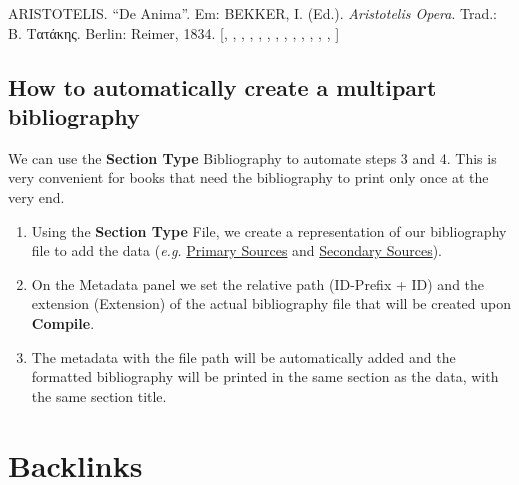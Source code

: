 \documentclass[
  10pt,
  oneside,
  cleardoublepage=empty,
  numbers=noenddot,
  titlepage,
  toclink=all,
  toc=bibliography,
  headinclude,
  footinclude]{scrbook}
\providecommand{\tightlist}{%
  \setlength{\itemsep}{0pt}\setlength{\parskip}{0pt}}\usepackage{longtable,booktabs,array}
\newlength{\cslhangindent}
\newenvironment{CSLReferences}[2] %
 {\begin{list}{}{%
  \setlength{\itemindent}{0pt}
  \setlength{\leftmargin}{0pt}
  \setlength{\parsep}{0pt}
  \ifodd #1
   \setlength{\leftmargin}{\cslhangindent}
   \setlength{\itemindent}{-1\cslhangindent}
  \fi
  \setlength{\itemsep}{#2\baselineskip}}}
 {\end{list}}
\theoremstyle{plain}
\theoremstyle{plain}
\theoremstyle{definition}
\theoremstyle{definition}
\theoremstyle{plain}
\theoremstyle{plain}
\theoremstyle{definition}
\theoremstyle{plain}
\theoremstyle{remark}
\begin{document}
\label{refs_primary-sources}
\begin{CSLReferences}{0}{1}
ARISTOTELIS. {``De Anima''}. Em: BEKKER, I. (Ed.). \emph{Aristotelis
Opera}. Trad.: Β. Τατάκης. Berlin: Reimer, 1834.
{[},
\hyperref[cite_13]{\pageref{cite_13}},
\hyperref[cite_14]{\pageref{cite_14}},
\hyperref[cite_15]{\pageref{cite_15}},
\hyperref[cite_16]{\pageref{cite_16}},
\hyperref[cite_17]{\pageref{cite_17}},
\hyperref[cite_18]{\pageref{cite_18}},
\hyperref[cite_19]{\pageref{cite_19}},
\hyperref[cite_20]{\pageref{cite_20}},
\hyperref[cite_21]{\pageref{cite_21}},
\hyperref[cite_22]{\pageref{cite_22}},
\hyperref[cite_23]{\pageref{cite_23}},
\hyperref[cite_24]{\pageref{cite_24}},
\hyperref[cite_25]{\pageref{cite_25}}{]}

\end{CSLReferences}

\subsection{How to automatically create a multipart
bibliography}\label{nte-multibib2}

We can use the \textbf{Section Type} Bibliography to automate steps 3
and 4. This is very convenient for books that need the bibliography to
print only once at the very end.

\begin{enumerate}
\def\labelenumi{\arabic{enumi}.}
\tightlist
\item
  Using the \textbf{Section Type} File, we create a representation of
  our bibliography file to add the data (\emph{e.g.}
  \href{refs/primary-sources.yml}{Primary Sources} and
  \href{refs/secondary-sources.yml}{Secondary Sources}).
\item
  On the Metadata panel we set the relative path (ID-Prefix + ID) and
  the extension (Extension) of the actual bibliography file that will be
  created upon \textbf{Compile}.
\item
  The metadata with the file path will be automatically added and the
  formatted bibliography will be printed in the same section as the
  data, with the same section title.
\end{enumerate}

\section{Backlinks}\label{backlinks}
\end{document}

